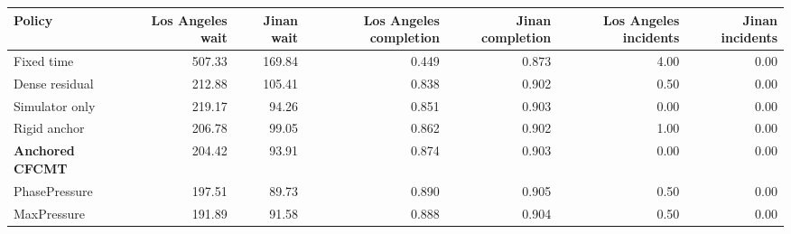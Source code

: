 \begin{tabular}{lrrrrrr}
\toprule
Policy & Los Angeles wait & Jinan wait & Los Angeles completion & Jinan completion & Los Angeles incidents & Jinan incidents \\
\midrule
Fixed time & 507.33 & 169.84 & 0.449 & 0.873 & 4.00 & 0.00 \\
Dense residual & 212.88 & 105.41 & 0.838 & 0.902 & 0.50 & 0.00 \\
Simulator only & 219.17 & 94.26 & 0.851 & 0.903 & 0.00 & 0.00 \\
Rigid anchor & 206.78 & 99.05 & 0.862 & 0.902 & 1.00 & 0.00 \\
\textbf{Anchored CFCMT} & 204.42 & 93.91 & 0.874 & 0.903 & 0.00 & 0.00 \\
PhasePressure & 197.51 & 89.73 & 0.890 & 0.905 & 0.50 & 0.00 \\
MaxPressure & 191.89 & 91.58 & 0.888 & 0.904 & 0.50 & 0.00 \\
\bottomrule
\end{tabular}
